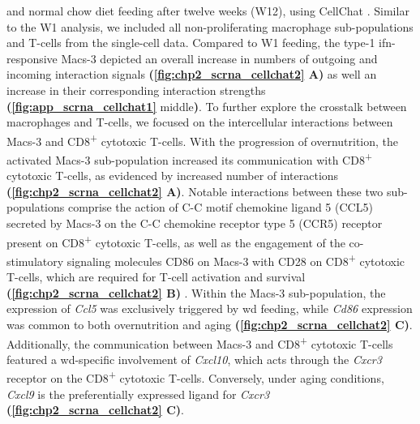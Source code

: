 and normal chow diet feeding after twelve weeks (W12), using CellChat \textbf{\cite{jin_cellchat_2023}}. Similar to the W1 analysis, we included all non-proliferating macrophage sub-populations and T-cells from the single-cell data. Compared to W1 feeding, the type-1 \gls{ifn}-responsive Macs-3 depicted an overall increase in numbers of outgoing and incoming interaction signals \textbf{(\autoref{fig:chp2_scrna_cellchat2} A)} as well an increase in their corresponding interaction strengths \textbf{(\autoref{fig:app_scrna_cellchat1}} middle\textbf{)}. To further explore the crosstalk between macrophages and T-cells, we focused on the intercellular interactions between Macs-3 and CD8\textsuperscript{+} cytotoxic T-cells. With the progression of overnutrition, the activated Macs-3 sub-population increased its communication with CD8\textsuperscript{+} cytotoxic T-cells, as evidenced by increased number of interactions \textbf{(\autoref{fig:chp2_scrna_cellchat2} A)}. Notable interactions between these two sub-populations comprise the action of C-C motif chemokine ligand 5 (CCL5) secreted by Macs-3 on the C-C chemokine receptor type 5 (CCR5) receptor present on CD8\textsuperscript{+} cytotoxic T-cells, as well as the engagement of the co-stimulatory signaling molecules CD86 on Macs-3 with CD28 on CD8\textsuperscript{+} cytotoxic T-cells, which are required for T-cell activation and survival \textbf{(\autoref{fig:chp2_scrna_cellchat2} B)} \textbf{\cite{sansom_cd28_2000}}. Within the Macs-3 sub-population, the expression of \textit{Ccl5} was exclusively triggered by \gls{wd} feeding, while \textit{Cd86} expression was common to both overnutrition and aging \textbf{(\autoref{fig:chp2_scrna_cellchat2} C)}. Additionally, the communication between Macs-3 and CD8\textsuperscript{+} cytotoxic T-cells featured a \gls{wd}-specific involvement of \textit{Cxcl10}, which acts through the \textit{Cxcr3} receptor on the CD8\textsuperscript{+} cytotoxic T-cells. Conversely, under aging conditions, \textit{Cxcl9} is the preferentially expressed ligand for \textit{Cxcr3} \textbf{(\autoref{fig:chp2_scrna_cellchat2} C)}.\\

